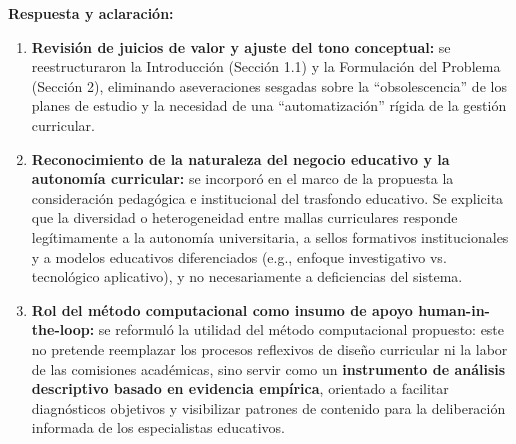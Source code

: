 \vspace{0.2cm}

\noindent
\textbf{Respuesta y aclaración:}
\begin{enumerate}[leftmargin=*]
	\item \textbf{Revisión de juicios de valor y ajuste del tono conceptual:} se reestructuraron la Introducción (Sección 1.1) y la Formulación del Problema (Sección 2), eliminando aseveraciones sesgadas sobre la ``obsolescencia'' de los planes de estudio y la necesidad de una ``automatización'' rígida de la gestión curricular.
	\item \textbf{Reconocimiento de la naturaleza del negocio educativo y la autonomía curricular:} se incorporó en el marco de la propuesta la consideración pedagógica e institucional del trasfondo educativo. Se explicita que la diversidad o heterogeneidad entre mallas curriculares responde legítimamente a la autonomía universitaria, a sellos formativos institucionales y a modelos educativos diferenciados (e.g., enfoque investigativo vs. tecnológico aplicativo), y no necesariamente a deficiencias del sistema.
	\item \textbf{Rol del método computacional como insumo de apoyo human-in-the-loop:} se reformuló la utilidad del método computacional propuesto: este no pretende reemplazar los procesos reflexivos de diseño curricular ni la labor de las comisiones académicas, sino servir como un \textbf{instrumento de análisis descriptivo basado en evidencia empírica}, orientado a facilitar diagnósticos objetivos y visibilizar patrones de contenido para la deliberación informada de los especialistas educativos.
\end{enumerate}

\newpage

\noindent
{}

\vspace{0.2cm}

